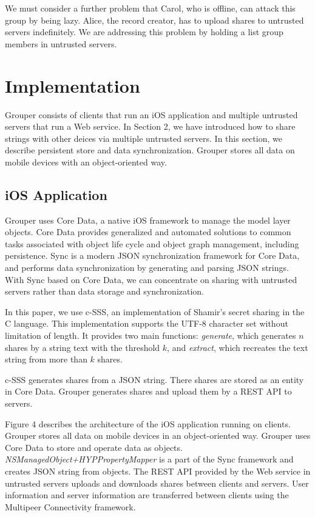 \documentclass[twocolumn,10pt]{article}
\begin{document}
We must consider a further problem that Carol, who is offline, can attack this group by being lazy. Alice, the record creator, has to upload shares to untrusted servers indefinitely. We are addressing this problem by holding a list group members in untrusted servers.

\section{Implementation}
Grouper consists of clients that run an iOS application and multiple untrusted servers that run a Web service. In Section 2, we have introduced how to share strings with other deices via multiple untrusted servers. In this section, we describe persistent store and data synchronization. Grouper stores all data on mobile devices with an object-oriented way.

\subsection{iOS Application}
 Grouper uses Core Data\cite{coredata}, a native iOS framework to manage the model layer objects. Core Data provides generalized and automated solutions to common tasks associated with object life cycle and object graph management, including persistence. Sync\cite{sync} is a modern JSON synchronization framework for Core Data, and performs data synchronization by generating and parsing JSON strings. With Sync based on Core Data, we can concentrate on sharing with untrusted servers rather than data storage and synchronization.

In this paper, we use c-SSS\cite{c-sss}, an implementation of Shamir's secret sharing in the C language. This implementation supports the UTF-8 character set without limitation of length. It provides two main functions: \emph{generate}, which generates $n$ shares by a string text with the threshold $k$, and \emph{extract}, which recreates the text string from more than $k$ shares. 

c-SSS generates shares from a JSON string. There shares are stored as an entity in Core Data. Grouper generates shares and upload them by a REST API to servers.

Figure 4 describes the architecture of the iOS application running on clients. Grouper stores all data on mobile devices in an object-oriented way. Grouper uses Core Data to store and operate data as objects. \emph{NSManagedObject+HYPPropertyMapper} is a part of the Sync framework and creates JSON string from objects. The REST API provided by the Web service in untrusted servers uploads and downloads shares between clients and servers. User information and server information are transferred between clients using the Multipeer Connectivity framework.
\end{document}
